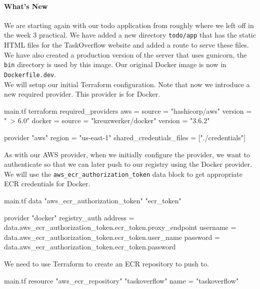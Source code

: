 \documentclass{csse4400}
\begin{document}
\paragraph{What's New}
We are starting again with our todo application from roughly where we left off in the week 3 practical.
We have added a new directory \texttt{todo/app} that has the static HTML files for the TaskOverflow website and added a route to serve these files.
We have also created a production version of the server that uses gunicorn,
the \texttt{bin} directory is used by this image.
Our original Docker image is now in \texttt{Dockerfile.dev}.\\


We will setup our initial Terraform configuration.
Note that now we introduce a new required provider.
This provider is for Docker.

\begin{code}[language=terraform,numbers=none]{main.tf}
terraform {
   required_providers {
      aws = {
         source = "hashicorp/aws"
         version = "~> 6.0"
      }
      docker = {
         source  = "kreuzwerker/docker"
         version = "3.6.2"
      }
   }
}

provider "aws" {
   region = "us-east-1"
   shared_credentials_files = ["./credentials"]
}
\end{code}

As with our AWS provider,
when we initially configure the provider,
we want to authenticate so that we can later push to our registry using the Docker provider.
We will use the \texttt{aws\_ecr\_authorization\_token} data block to get appropriate ECR credentials for Docker.

\begin{code}[language=terraform,numbers=none]{main.tf}
data "aws_ecr_authorization_token" "ecr_token" {}

provider "docker" {
  registry_auth {
    address  = data.aws_ecr_authorization_token.ecr_token.proxy_endpoint
    username = data.aws_ecr_authorization_token.ecr_token.user_name
    password = data.aws_ecr_authorization_token.ecr_token.password
  }
}
\end{code}

We need to use Terraform to create an ECR repository to push to.

\begin{code}[language=terraform,numbers=none]{main.tf}
resource "aws_ecr_repository" "taskoverflow" {
  name = "taskoverflow"
}
\end{code}
\end{document}

